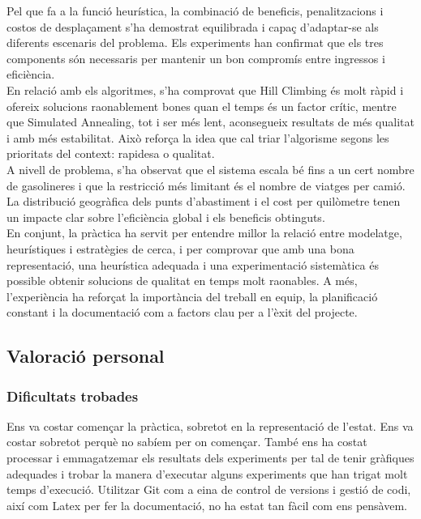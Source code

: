 Pel que fa a la funció heurística, la combinació de beneficis, penalitzacions i costos de desplaçament s’ha demostrat equilibrada i capaç d’adaptar-se als diferents escenaris del problema. Els experiments han confirmat que els tres components són necessaris per mantenir un bon compromís entre ingressos i eficiència. \\

En relació amb els algoritmes, s’ha comprovat que Hill Climbing és molt ràpid i ofereix solucions raonablement bones quan el temps és un factor crític, mentre que Simulated Annealing, tot i ser més lent, aconsegueix resultats de més qualitat i amb més estabilitat. Això reforça la idea que cal triar l’algorisme segons les prioritats del context: rapidesa o qualitat. \\

A nivell de problema, s’ha observat que el sistema escala bé fins a un cert nombre de gasolineres i que la restricció més limitant és el nombre de viatges per camió. La distribució geogràfica dels punts d’abastiment i el cost per quilòmetre tenen un impacte clar sobre l’eficiència global i els beneficis obtinguts. \\

En conjunt, la pràctica ha servit per entendre millor la relació entre modelatge, heurístiques i estratègies de cerca, i per comprovar que amb una bona representació, una heurística adequada i una experimentació sistemàtica és possible obtenir solucions de qualitat en temps molt raonables. A més, l’experiència ha reforçat la importància del treball en equip, la planificació constant i la documentació com a factors clau per a l’èxit del projecte. \\

\subsection{Valoració personal}

\subsubsection{Dificultats trobades}
Ens va costar començar la pràctica, sobretot en la representació de l'estat. Ens va costar sobretot perquè no sabíem per on començar. També ens ha costat processar i emmagatzemar els resultats dels experiments per tal de tenir gràfiques adequades i trobar la manera d'executar alguns experiments que han trigat molt temps d'execució. Utilitzar Git com a eina de control de versions i gestió de codi, així com Latex per fer la documentació, no ha estat tan fàcil com ens pensàvem.



